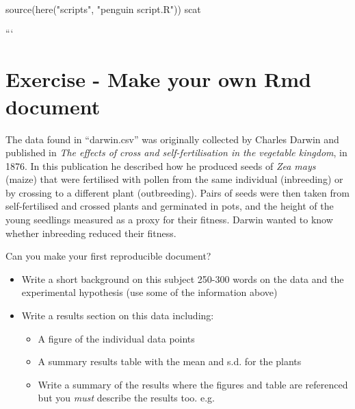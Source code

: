 \documentclass[
]{book}
\makeatletter
\newenvironment{Shaded}{\begin{snugshade}}{\end{snugshade}}
\newcommand{\FunctionTok}[1]{\textcolor[rgb]{0.00,0.00,0.00}{#1}}
\newcommand{\NormalTok}[1]{#1}
\newcommand{\StringTok}[1]{\textcolor[rgb]{0.31,0.60,0.02}{#1}}
\newenvironment{kframe}{%
\medskip{}
\setlength{\fboxsep}{.8em}
 \def\at@end@of@kframe{}%
 \ifinner\ifhmode%
  \def\at@end@of@kframe{\end{minipage}}%
  \begin{minipage}{\columnwidth}%
 \fi\fi%
 \def\FrameCommand##1{\hskip\@totalleftmargin \hskip-\fboxsep
 \colorbox{shadecolor}{##1}\hskip-\fboxsep
     \hskip-\linewidth \hskip-\@totalleftmargin \hskip\columnwidth}%
 \MakeFramed {\advance\hsize-\width
   \@totalleftmargin\z@ \linewidth\hsize
   \@setminipage}}%
 {\par\unskip\endMakeFramed%
 \at@end@of@kframe}
\newenvironment{block}[1]
  {
  \begin{itemize}
  \renewcommand{\labelitemi}{
    \raisebox{-.7\height}[0pt][0pt]{
      {\setkeys{Gin}{width=3em,keepaspectratio}\texttt{[image: images/\#1]}}
    }
  }
  \setlength{\fboxsep}{1em}
  \begin{kframe}
  \item
  }
  {
  \end{kframe}
  \end{itemize}
  }
\newenvironment{rmdquestion}
  {\begin{block}{question}}
  {\end{block}}
\makeatother
\begin{document}
\begin{Shaded}
\begin{Highlighting}[]
\FunctionTok{source}\NormalTok{(}\FunctionTok{here}\NormalTok{(}\StringTok{"scripts"}\NormalTok{, }\StringTok{"penguin script.R"}\NormalTok{))}
\NormalTok{scat}
\end{Highlighting}
\end{Shaded}

```

\hypertarget{exercise---make-your-own-rmd-document}{%
\section{Exercise - Make your own Rmd document}\label{exercise---make-your-own-rmd-document}}

The data found in ``darwin.csv'' was originally collected by Charles Darwin and published in \emph{The effects of cross and self-fertilisation in the vegetable kingdom}, in 1876. In this publication he described how he produced seeds of \emph{Zea mays} (maize) that were fertilised with pollen from the same individual (inbreeding) or by crossing to a different plant (outbreeding). Pairs of seeds were then taken from self-fertilised and crossed plants and germinated in pots, and the height of the young seedlings measured as a proxy for their fitness. Darwin wanted to know whether inbreeding reduced their fitness.

\begin{rmdquestion}
Can you make your first reproducible document?
\end{rmdquestion}

\begin{itemize}
\item
  Write a short background on this subject 250-300 words on the data and the experimental hypothesis (use some of the information above)
\item
  Write a results section on this data including:

  \begin{itemize}
  \item
    A figure of the individual data points
  \item
    A summary results table with the mean and s.d. for the plants
  \item
    Write a summary of the results where the figures and table are referenced but you \emph{must} describe the results too. e.g.~
  \end{itemize}
\end{itemize}
\end{document}
